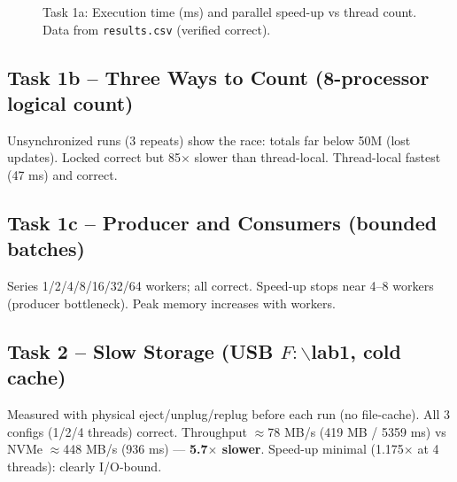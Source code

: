 \documentclass[12pt,a4paper]{article}
\begin{document}
\begin{figure}[htbp]
\centering
{}
\hfill
{}
\caption{Task 1a: Execution time (ms) and parallel speed-up vs thread count. Data from \texttt{results.csv} (verified correct).}
\label{fig:task1a}
\end{figure}

\subsection{Task 1b -- Three Ways to Count (8-processor logical count)}
Unsynchronized runs (3 repeats) show the race: totals far below 50M (lost updates). Locked correct but 85$\times$ slower than thread-local. Thread-local fastest (47 ms) and correct.

\subsection{Task 1c -- Producer and Consumers (bounded batches)}
Series 1/2/4/8/16/32/64 workers; all correct. Speed-up stops near 4--8 workers (producer bottleneck). Peak memory increases with workers.

\subsection{Task 2 -- Slow Storage (USB $F:\backslash$lab1, cold cache)}
Measured with physical eject/unplug/replug before each run (no file-cache). All 3 configs (1/2/4 threads) correct. Throughput $\approx$78 MB/s (419 MB / 5359 ms) vs NVMe $\approx$448 MB/s (936 ms) --- \textbf{5.7$\times$ slower}. Speed-up minimal (1.175$\times$ at 4 threads): clearly I/O-bound.
\end{document}
